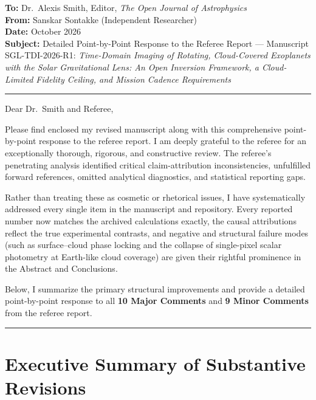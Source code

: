 \documentclass[11pt]{article}
\begin{document}
\textbf{To:} Dr.\ Alexis Smith, Editor, \textit{The Open Journal of Astrophysics}\\
\textbf{From:} Sanskar Sontakke (Independent Researcher)\\
\textbf{Date:} October 2026\\
\textbf{Subject:} Detailed Point-by-Point Response to the Referee Report — Manuscript SGL-TDI-2026-R1: \textit{Time-Domain Imaging of Rotating, Cloud-Covered Exoplanets with the Solar Gravitational Lens: An Open Inversion Framework, a Cloud-Limited Fidelity Ceiling, and Mission Cadence Requirements}\\[2mm]
\hrule
\vspace{3mm}

Dear Dr.\ Smith and Referee,

Please find enclosed my revised manuscript along with this comprehensive point-by-point response to the referee report. I am deeply grateful to the referee for an exceptionally thorough, rigorous, and constructive review. The referee's penetrating analysis identified critical claim-attribution inconsistencies, unfulfilled forward references, omitted analytical diagnostics, and statistical reporting gaps.

Rather than treating these as cosmetic or rhetorical issues, I have systematically addressed every single item in the manuscript and repository. Every reported number now matches the archived calculations exactly, the causal attributions reflect the true experimental contrasts, and negative and structural failure modes (such as surface--cloud phase locking and the collapse of single-pixel scalar photometry at Earth-like cloud coverage) are given their rightful prominence in the Abstract and Conclusions.

Below, I summarize the primary structural improvements and provide a detailed point-by-point response to all \textbf{10 Major Comments} and \textbf{9 Minor Comments} from the referee report.

\vspace{3mm}
\hrule
\vspace{3mm}

\section*{Executive Summary of Substantive Revisions}
\end{document}
